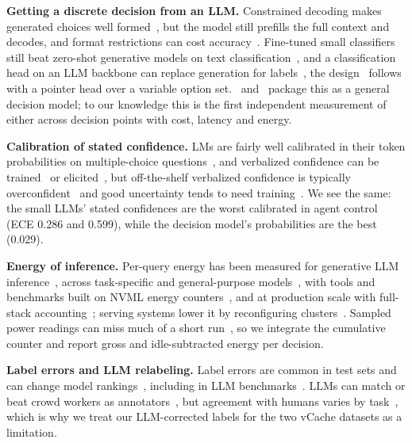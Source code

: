 \textbf{Getting a discrete decision from an LLM.}
Constrained decoding makes generated choices well formed~\cite{willard2023efficient,zheng2024sglang,dong2025xgrammar}, but the model still prefills the full context and decodes, and format restrictions can cost accuracy~\cite{tam2024speak}.
Fine-tuned small classifiers still beat zero-shot generative models on text classification~\cite{bucher2024finetuned}, and a classification head on an LLM backbone can replace generation for labels~\cite{li2023label}, the design \kev\ follows with a pointer head over a variable option set.
\jev\ and \kev\ package this as a general decision model; to our knowledge this is the first independent measurement of either across decision points with cost, latency and energy.

\textbf{Calibration of stated confidence.}
LMs are fairly well calibrated in their token probabilities on multiple-choice questions~\cite{kadavath2022language}, and verbalized confidence can be trained~\cite{lin2022teaching} or elicited~\cite{tian2023just}, but off-the-shelf verbalized confidence is typically overconfident~\cite{xiong2024can} and good uncertainty tends to need training~\cite{kapoor2024large}.
We see the same: the small LLMs' stated confidences are the worst calibrated in agent control (ECE 0.286 and 0.599), while the decision model's probabilities are the best (0.029).

\textbf{Energy of inference.}
Per-query energy has been measured for generative LLM inference~\cite{samsi2023words}, across task-specific and general-purpose models~\cite{luccioni2024power}, with tools and benchmarks built on NVML energy counters~\cite{you2023zeus,chung2025mlenergy}, and at production scale with full-stack accounting~\cite{elsworth2025measuring}; serving systems lower it by reconfiguring clusters~\cite{stojkovic2024dynamollm}.
Sampled power readings can miss much of a short run~\cite{yang2023parttime}, so we integrate the cumulative counter and report gross and idle-subtracted energy per decision.

\textbf{Label errors and LLM relabeling.}
Label errors are common in test sets and can change model rankings~\cite{northcutt2021pervasive}, including in LLM benchmarks~\cite{gema2025done,vendrow2025platinum}.
LLMs can match or beat crowd workers as annotators~\cite{gilardi2023chatgpt}, but agreement with humans varies by task~\cite{zheng2023judging,bavaresco2025llms}, which is why we treat our LLM-corrected labels for the two vCache datasets as a limitation.
